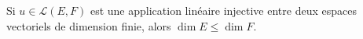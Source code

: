 Si $u\in \mathcal{L}(E,F)$ est une application linéaire injective entre deux espaces vectoriels de dimension finie, alors $\dim E \leq\dim F$.

\begin{reponses}
\end{reponses}

